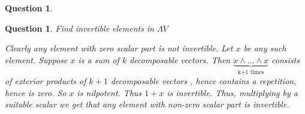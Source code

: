 \documentclass[a4paper]{article}
\newtheorem{que}[thm]{Question}
\begin{document}
\begin{que}
\begin{enumerate}
\begin{itemize}
                 
                 
         \end{itemize}
 \end{enumerate}

\end{que}
\begin{que} Find invertible elements in $\Lambda V$
	
	Clearly any element with zero scalar part is not invertible. Let $x$ be any such element. Suppose $x$ is a sum of $k$ decomposable vectors. Then $\underbrace{x \wedge ... \wedge x}_\text{k+1 times}$ consists of exterior products of $k+1$ decomposable vectors , hence contains a repetition, hence is zero. So $x$ is nilpotent. Thus $1+x$ is invertible. Thus, multiplying by a suitable scalar we get that any element with non-zero scalar part is invertible.
	
\end{que}
\end{document}

